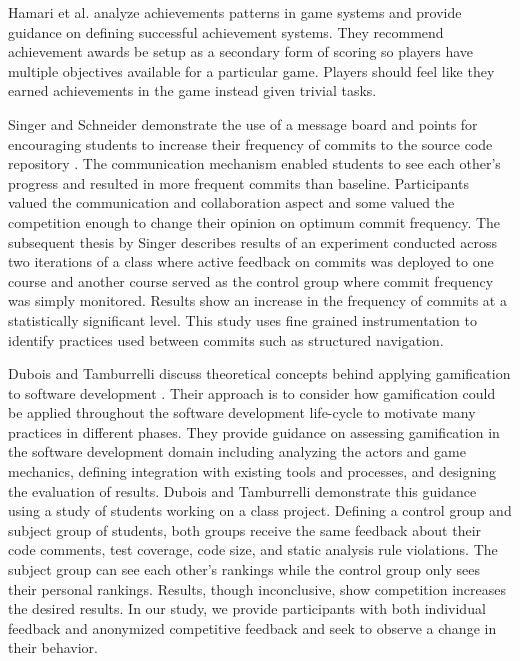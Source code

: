 \documentclass{sig-alternate}
\begin{document}
Hamari et al. analyze achievements patterns in game systems and provide guidance on defining successful achievement systems.  They recommend achievement awards be setup as a secondary form of scoring so players have multiple objectives available for a particular game.  Players should feel like they earned achievements in the game instead given trivial tasks.

Singer and Schneider demonstrate the use of a message board and points for encouraging students to increase their frequency of commits to the source code repository \cite{Singer2012It}.  The communication mechanism enabled students to see each other's progress and resulted in more frequent commits than baseline.  Participants valued the communication and collaboration aspect and some valued the competition enough to change their opinion on optimum commit frequency.  The subsequent thesis by Singer \cite{Singer2013a} describes results of an experiment conducted across two iterations of a class where active feedback on commits was deployed to one course and another course served as the control group where commit frequency was simply monitored.  Results show an increase in the frequency of commits at a statistically significant level.  This study uses fine grained instrumentation to identify practices used between commits such as structured navigation.

Dubois and Tamburrelli discuss theoretical concepts behind applying gamification to software development \cite{Dubois2013Understanding}. Their approach is to consider how gamification could be applied throughout the software development life-cycle to motivate many practices in different phases.  They provide guidance on assessing gamification in the software development domain including analyzing the actors and game mechanics, defining integration with existing tools and processes, and designing the evaluation of results.  Dubois and Tamburrelli demonstrate this guidance using a study of students working on a class project.  Defining a control group and subject group of students, both groups receive the same feedback about their code comments, test coverage, code size, and static analysis rule violations.  The subject group can see each other's rankings while the control group only sees their personal rankings.  Results, though inconclusive, show competition increases the desired results.  In our study, we provide participants with both individual feedback and anonymized competitive feedback and seek to observe a change in their behavior.
\end{document}

